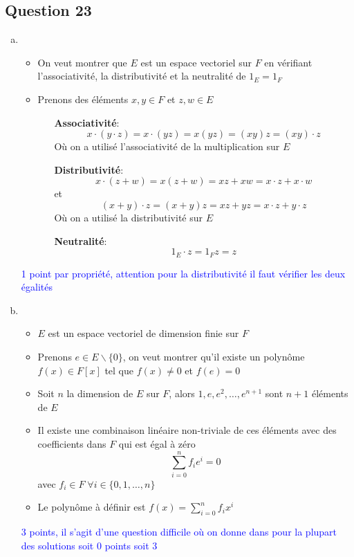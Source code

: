 \documentclass[11pt, a4paper, oneside]{article}
\newcommand{\indice}[1]{{\scriptsize \color{RubineRed} {#1}}}
\begin{document}
\subsection*{Question 23}
\begin{enumerate}[a)]
\item
\begin{itemize}
\item On veut montrer que $E$ est un espace vectoriel sur $F$ en vérifiant l'associativité, la distributivité et la neutralité de $1_E = 1_F$
\item Prenons des éléments $x,y \in F$ et $z,w \in E$
\begin{itemize}
    \item [\textbf{Associativité}:] $$x\cdot(y\cdot z) = x\cdot(yz) = x(yz) = (xy)z = (xy) \cdot z$$ \indice{Où on a utilisé l'associativité de la multiplication sur $E$}
    \item [\textbf{Distributivité}:] $$x\cdot(z+w) = x(z+w) = xz+xw = x\cdot z + x\cdot w$$
    et
    $$(x+y)\cdot z = (x+y)z = xz + yz = x\cdot z + y\cdot z$$
    \indice{Où on a utilisé la distributivité sur $E$}
    \item [\textbf{Neutralité}:] $$1_E\cdot z = 1_Fz = z$$
\end{itemize}
\end{itemize}
\textcolor{blue}{1 point par propriété, attention pour la distributivité il faut vérifier les deux égalités}

\item
\begin{itemize}
\item $E$ est un espace vectoriel de dimension finie sur $F$
\item Prenons $e\in E \backslash \{0\}$, on veut montrer qu'il existe un polynôme $f(x) \in F[x]$ tel que $f(x) \neq 0$ et $f(e)=0$
\item Soit $n$ la dimension de $E$ sur $F$, alors $1,e,e^2,\ldots,e^{n+1}$ sont $n+1$ éléments de $E$ 
\item Il existe une combinaison linéaire non-triviale de ces éléments avec des coefficients dans $F$ qui est égal à zéro
$$\sum_{i=0}^n f_ie^i = 0$$
avec $f_i \in F \; \forall i\in \{0,1,\ldots,n\}$
\item Le polynôme à définir est $f(x) = \sum_{i=0}^n f_ix^i$ \\
\end{itemize}
\textcolor{blue}{3 points, il s'agit d'une question difficile où on donne dans pour la plupart des solutions soit 0 points soit 3}


\end{enumerate}
\end{document}
